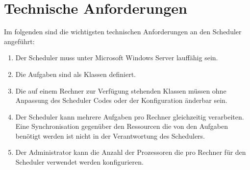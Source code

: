 \section{Technische Anforderungen}
Im folgenden sind die wichtigsten technischen Anforderungen an den Scheduler angeführt:
\begin{enumerate}
	\item Der Scheduler muss unter Microsoft Windows Server lauffähig sein.
	\item Die Aufgaben sind als Klassen definiert.
	\item Die auf einem Rechner zur Verfügung stehenden Klassen müssen ohne Anpassung des Scheduler Codes oder der Konfiguration änderbar sein.
	\item Der Scheduler kann mehrere Aufgaben pro Rechner gleichzeitig verarbeiten. Eine Synchronisation gegenüber den Ressourcen die von den Aufgaben benötigt werden ist nicht in der Verantwortung des Schedulers.
	\item Der Administrator kann die Anzahl der Prozessoren die pro Rechner für den Scheduler verwendet werden konfigurieren.
\end{enumerate}

\chapterend
